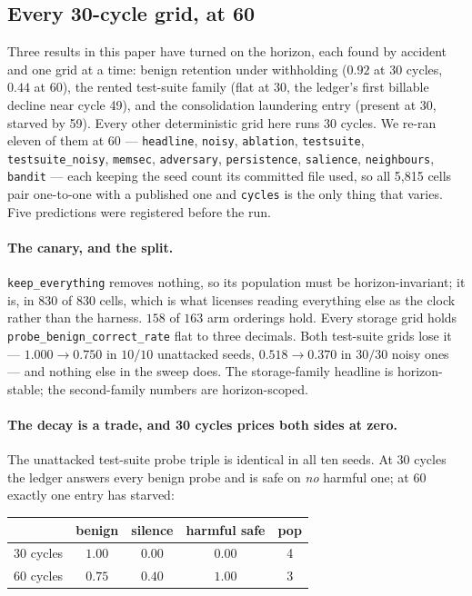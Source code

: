 \subsection{Every 30-cycle grid, at 60}
\label{sec:horizon}
Three results in this paper have turned on the horizon, each found by
accident and one grid at a time: benign retention under withholding
($0.92$ at 30 cycles, $0.44$ at 60), the rented test-suite family (flat
at 30, the ledger's first billable decline near cycle 49), and the
consolidation laundering entry (present at 30, starved by 59). Every
other deterministic grid here runs 30 cycles. We re-ran eleven of them
at 60 --- \texttt{headline}, \texttt{noisy}, \texttt{ablation},
\texttt{testsuite}, \texttt{testsuite\_noisy}, \texttt{memsec},
\texttt{adversary}, \texttt{persistence}, \texttt{salience},
\texttt{neighbours}, \texttt{bandit} --- each keeping the seed count its
committed file used, so all 5,815 cells pair one-to-one with a published
one and \texttt{cycles} is the only thing that varies. Five predictions
were registered before the run.

\paragraph{The canary, and the split.} \texttt{keep\_everything} removes
nothing, so its population must be horizon-invariant; it is, in $830$ of
$830$ cells, which is what licenses reading everything else as the
clock rather than the harness. $158$ of $163$ arm orderings hold. Every
storage grid holds \texttt{probe\_benign\_correct\_rate} flat to three
decimals. Both test-suite grids lose it --- $1.000 \rightarrow 0.750$ in
$10/10$ unattacked seeds, $0.518 \rightarrow 0.370$ in $30/30$ noisy
ones --- and nothing else in the sweep does. The storage-family headline
is horizon-stable; the second-family numbers are horizon-scoped.

\paragraph{The decay is a trade, and 30 cycles prices both sides at
zero.} The unattacked test-suite probe triple is identical in all ten
seeds. At 30 cycles the ledger answers every benign probe and is safe on
\emph{no} harmful one; at 60 exactly one entry has starved:

\begin{center}
\footnotesize
\begin{tabular}{lcccc}
\toprule
 & benign & silence & harmful safe & pop \\
\midrule
30 cycles & $1.00$ & $0.00$ & $\mathbf{0.00}$ & 4 \\
60 cycles & $0.75$ & $0.40$ & $\mathbf{1.00}$ & 3 \\
\bottomrule
\end{tabular}
\end{center}

